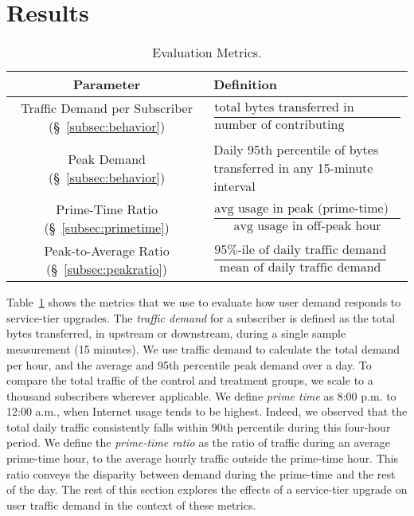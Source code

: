 \section{Results}\label{sec:analysis}

\begin{table}[t]
\centering
\begin{small}
\begin{tabular}{| c | p{2.44in} |}\hline
\textbf{Parameter} & \textbf{Definition}	\\\hline
Traffic Demand per Subscriber (\S~\ref{subsec:behavior})	& \(\dfrac{\text{total bytes transferred in 
measurement int.}}{\text{number of contributing subscribers}}\)	\\
Peak Demand (\S~\ref{subsec:behavior})			& Daily 95th percentile of bytes transferred in any 
15-minute interval \\ 
Prime-Time Ratio (\S~\ref{subsec:primetime}) 	& \( \dfrac{ \text{avg usage in peak (prime-time) 
hour}}{ \text{avg usage in off-peak hour}}\) 		\\
Peak-to-Average Ratio (\S~\ref{subsec:peakratio}) 	& \(\dfrac{\text{95\%-ile of daily traffic 
demand}}{\text{mean of daily traffic demand}}\)	\\\hline
\end{tabular}
\end{small}
\caption{Evaluation Metrics.}
\label{tab:eval-criteria}
\end{table}

Table~\ref{tab:eval-criteria} shows the metrics that we use to evaluate
how user demand responds to service-tier upgrades. The \emph{traffic
  demand} for a subscriber is defined as the total bytes transferred, in
upstream or downstream, during a single sample measurement (15 minutes).
We use traffic demand to calculate the total demand per hour, and the
average and 95th percentile peak demand over a day. To compare the total
traffic of the control and treatment groups, we scale to a thousand
subscribers wherever applicable. We
define \emph{prime time} as 8:00 p.m. to 12:00 a.m., when Internet usage
tends to be highest.  Indeed, we
observed that the total daily traffic consistently falls within 90th percentile
during this four-hour period. We define the \emph{prime-time ratio} as
the ratio of traffic during an average prime-time hour, to the average
hourly traffic outside the prime-time hour.  This ratio conveys the
disparity between demand during the prime-time and the rest of the day.
The rest of this section explores the effects of a service-tier upgrade
on user traffic demand in the context of these metrics.









%
